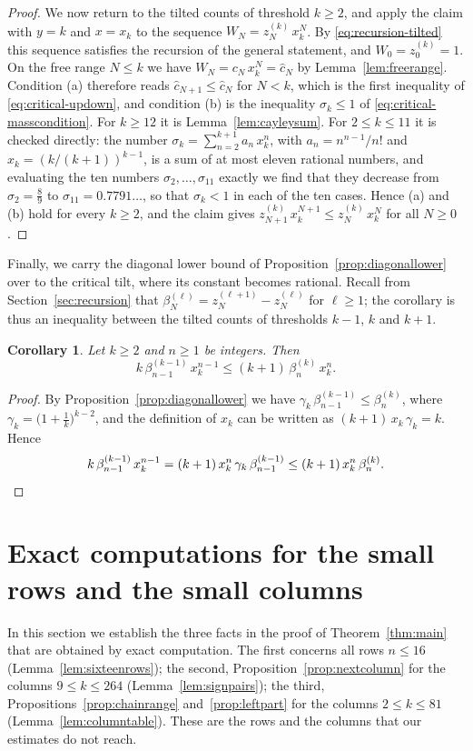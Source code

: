 \documentclass{amsart}
\newtheorem{corollary}[theorem]{Corollary}
\theoremstyle{definition}
\theoremstyle{remark}
\numberwithin{equation}{section}
\begin{document}
\begin{proof}
We now return to the tilted counts of threshold $k\ge 2$, and apply the claim with $y=k$ and $x=x_k$ to the sequence $W_N=z^{(k)}_N\,x_k^{N}$. By \eqref{eq:recursion-tilted} this sequence satisfies the recursion of the general statement, and $W_0=z^{(k)}_0=1$. On the free range $N\le k$ we have $W_N=c_N\,x_k^{N}=\hat c_N$ by Lemma~\ref{lem:freerange}. Condition (a) therefore reads $\hat c_{N+1}\le\hat c_N$ for $N<k$, which is the first inequality of \eqref{eq:critical-updown}, and condition (b) is the inequality $\sigma_k\le 1$ of \eqref{eq:critical-masscondition}. For $k\ge 12$ it is Lemma~\ref{lem:cayleysum}. For $2\le k\le 11$ it is checked directly: the number $\sigma_k=\sum_{n=2}^{k+1}a_n\,x_k^{n}$, with $a_n=n^{n-1}/n!$ and $x_k=(k/(k+1))^{k-1}$, is a sum of at most eleven rational numbers, and evaluating the ten numbers $\sigma_2,\dots,\sigma_{11}$ exactly we find that they decrease from $\sigma_2=\frac89$ to $\sigma_{11}=0.7791\ldots$, so that $\sigma_k<1$ in each of the ten cases. Hence (a) and (b) hold for every $k\ge 2$, and the claim gives $z^{(k)}_{N+1}\,x_k^{N+1}\le z^{(k)}_N\,x_k^{N}$ for all $N\ge 0$.
\end{proof}

Finally, we carry the diagonal lower bound of Proposition~\ref{prop:diagonallower} over to the critical tilt, where its constant becomes rational. Recall from Section~\ref{sec:recursion} that $\beta^{(\ell)}_N=z^{(\ell+1)}_N-z^{(\ell)}_N$ for $\ell\ge 1$; the corollary is thus an inequality between the tilted counts of thresholds $k-1$, $k$ and $k+1$.

\begin{corollary}\label{cor:diagonalcritical}
Let $k\ge 2$ and $n\ge 1$ be integers. Then
\[
k\,\beta^{(k-1)}_{n-1}\,x_k^{n-1}\le(k+1)\,\beta^{(k)}_n\,x_k^{n}.
\]
\end{corollary}

\begin{proof}
By Proposition~\ref{prop:diagonallower} we have $\gamma_k\,\beta^{(k-1)}_{n-1}\le\beta^{(k)}_n$, where $\gamma_k=\bigl(1+\frac1k\bigr)^{k-2}$, and the definition of $x_k$ can be written as $(k+1)\,x_k\,\gamma_k=k$. Hence
\[
k\,\beta^{(k-1)}_{n-1}\,x_k^{n-1}=(k+1)\,x_k^{n}\,\gamma_k\,\beta^{(k-1)}_{n-1}\le(k+1)\,x_k^{n}\,\beta^{(k)}_n.\qedhere
\]
\end{proof}

\section{Exact computations for the small rows and the small columns}\label{sec:tables}
In this section we establish the three facts in the proof of Theorem~\ref{thm:main} that are obtained by exact computation. The first concerns all rows $n\le 16$ (Lemma~\ref{lem:sixteenrows}); the second, Proposition~\ref{prop:nextcolumn} for the columns $9\le k\le 264$ (Lemma~\ref{lem:signpairs}); the third, Propositions~\ref{prop:chainrange} and~\ref{prop:leftpart} for the columns $2\le k\le 81$ (Lemma~\ref{lem:columntable}). These are the rows and the columns that our estimates do not reach.
\end{document}
